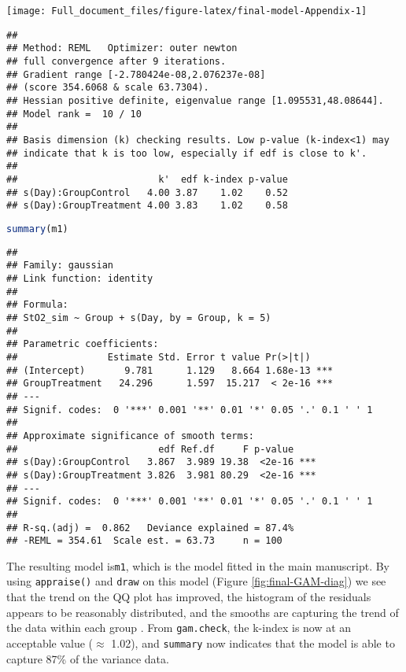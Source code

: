 \documentclass[
]{article}
\newcommand{\passthrough}[1]{#1}
\begin{document}
\texttt{[image: Full\_document\_files/figure-latex/final-model-Appendix-1]}

\begin{lstlisting}
## 
## Method: REML   Optimizer: outer newton
## full convergence after 9 iterations.
## Gradient range [-2.780424e-08,2.076237e-08]
## (score 354.6068 & scale 63.7304).
## Hessian positive definite, eigenvalue range [1.095531,48.08644].
## Model rank =  10 / 10 
## 
## Basis dimension (k) checking results. Low p-value (k-index<1) may
## indicate that k is too low, especially if edf is close to k'.
## 
##                         k'  edf k-index p-value
## s(Day):GroupControl   4.00 3.87    1.02    0.52
## s(Day):GroupTreatment 4.00 3.83    1.02    0.58
\end{lstlisting}

\begin{lstlisting}[language=R]
summary(m1)
\end{lstlisting}

\begin{lstlisting}
## 
## Family: gaussian 
## Link function: identity 
## 
## Formula:
## StO2_sim ~ Group + s(Day, by = Group, k = 5)
## 
## Parametric coefficients:
##                Estimate Std. Error t value Pr(>|t|)    
## (Intercept)       9.781      1.129   8.664 1.68e-13 ***
## GroupTreatment   24.296      1.597  15.217  < 2e-16 ***
## ---
## Signif. codes:  0 '***' 0.001 '**' 0.01 '*' 0.05 '.' 0.1 ' ' 1
## 
## Approximate significance of smooth terms:
##                         edf Ref.df     F p-value    
## s(Day):GroupControl   3.867  3.989 19.38  <2e-16 ***
## s(Day):GroupTreatment 3.826  3.981 80.29  <2e-16 ***
## ---
## Signif. codes:  0 '***' 0.001 '**' 0.01 '*' 0.05 '.' 0.1 ' ' 1
## 
## R-sq.(adj) =  0.862   Deviance explained = 87.4%
## -REML = 354.61  Scale est. = 63.73     n = 100
\end{lstlisting}

The resulting model is\passthrough{\lstinline!m1!}, which is the model fitted in the main manuscript. By using \passthrough{\lstinline!appraise()!} and \passthrough{\lstinline!draw!} on this model (Figure \ref{fig:final-GAM-diag}) we see that the trend on the QQ plot has improved, the histogram of the residuals appears to be reasonably distributed, and the smooths are capturing the trend of the data within each group . From \passthrough{\lstinline!gam.check!}, the k-index is now at an acceptable value (\(\approx\) 1.02), and \passthrough{\lstinline!summary!} now indicates that the model is able to capture 87\% of the variance data.
\end{document}
